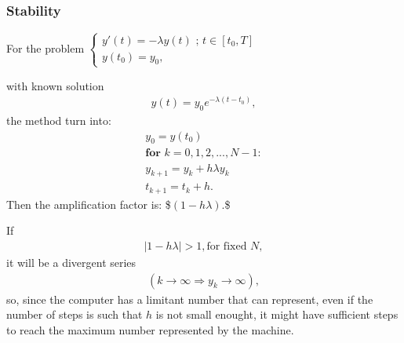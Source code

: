 \documentclass[letterpaper,10pt,english]{jupyterBook}
\begin{document}
\subsubsection{Stability}
\label{\detokenize{cap2:stability}}
\sphinxAtStartPar
For the problem
\(\begin{cases}
    y'(t) = - \lambda y(t) \text{ ; } t \in [t_0 , T] \\
    y(t_0)=y_0,
\end{cases}\)

\sphinxAtStartPar
with known solution
\begin{equation*}
\begin{split} y(t) = y_0e^{-\lambda (t-t_0)},\end{split}
\end{equation*}
\sphinxAtStartPar
the method turn into:
\begin{equation*}
\begin{split}
y_0 = y(t_0)\\
\textbf{for } k = 0, 1, 2, ..., N-1 :\\
    y_{k+1} = y_k + h \lambda y_k \\
    t_{k+1} = t_k + h.
\end{split}
\end{equation*}
\sphinxAtStartPar
Then the amplification factor is:
\$\(
(1 - h \lambda).
\)\$

\sphinxAtStartPar
If
\begin{equation*}
\begin{split}
|1 - h \lambda| > 1, \text{for fixed } N,
\end{split}
\end{equation*}
\sphinxAtStartPar
it will be a divergent series
\begin{equation*}
\begin{split}
(k \rightarrow \infty \Rightarrow y_k \rightarrow \infty),
\end{split}
\end{equation*}
\sphinxAtStartPar
so, since the computer has a limitant number that can represent, even if the number of steps is such that \(h\) is not small enought, it might have sufficient steps to reach the maximum number represented by the machine.
\end{document}

